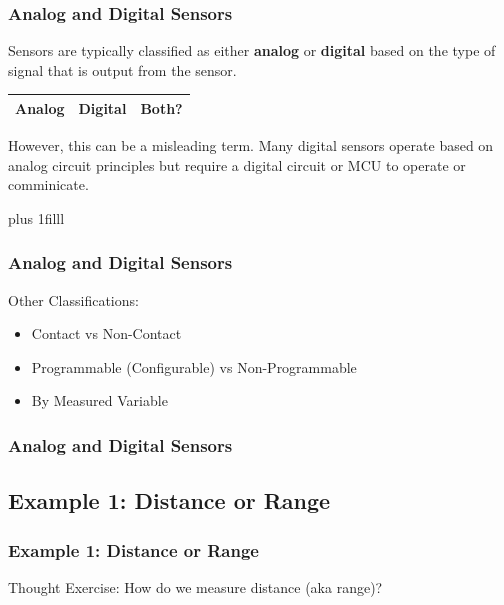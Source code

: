 \documentclass[fleqn]{beamer} %
\newcommand{\sectionIsubsectionIItitle}{Analog and Digital Sensors}
\newcommand{\sectionIsubsectionIIItitle}{Example 1: Distance or Range}
\newcommand{\btVFill}{\vskip0pt plus 1filll}
\begin{document}
			\begin{frame}
				\frametitle{\sectionIsubsectionIItitle}

				Sensors are typically classified as either {\bf analog} or {\bf digital} based on the type of signal that is output from the sensor.

				\begin{tabular}{|c|c|c|} \hline
				 	Analog \hspace*{10mm}& Digital \hspace*{10mm}& Both? \hspace*{10mm} \\ \hline   
				\end{tabular}	

				However, this can be a misleading term. Many digital sensors operate based on analog circuit principles but require a digital circuit or MCU to operate or comminicate. 

				                             		
				\btVFill

			\end{frame}

			\begin{frame}
				\frametitle{\sectionIsubsectionIItitle}

				Other Classifications:
				\begin{itemize}
					\item Contact vs Non-Contact

					\item Programmable (Configurable) vs Non-Programmable

					\item By Measured Variable	

				\end{itemize}


			\end{frame}

			\begin{frame}
				\frametitle{\sectionIsubsectionIItitle}
		
			\end{frame}


		\subsection{\sectionIsubsectionIIItitle}\label{sectionIsubsectionIII}
			\begin{frame} 
				\frametitle{\sectionIsubsectionIIItitle}
				Thought Exercise: How do we measure distance (aka range)?   
				
			\end{frame}	
\end{document}
